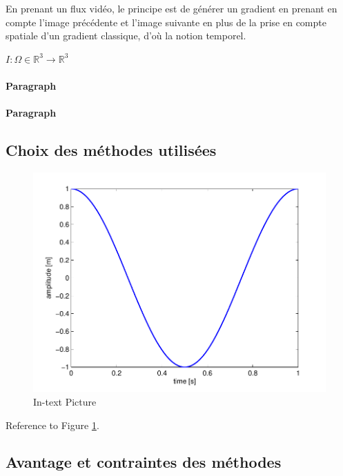 \documentclass[fleqn,10pt]{SelfArx} %
\begin{document}
En prenant un flux vidéo, le principe est de générer un gradient en prenant en compte l'image précédente et
l'image suivante en plus de la prise en compte spatiale d'un gradient classique, d'où la notion temporel.

$ I : \Omega \in \mathbb{R}^{3} \to \mathbb{R}^{3} $





\lipsum[6] %

\paragraph{Paragraph} \lipsum[7] %
\paragraph{Paragraph} \lipsum[8] %

\subsection{Choix des méthodes utilisées}

\lipsum[9] %

\begin{figure}[ht]\centering
\includegraphics[width=\linewidth]{results}
\caption{In-text Picture}
\label{fig:results}
\end{figure}

Reference to Figure \ref{fig:results}.
\subsection{Avantage et contraintes des méthodes}
\end{document}
